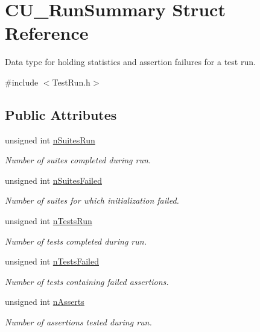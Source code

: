 \hypertarget{struct_c_u___run_summary}{\section{C\+U\+\_\+\+Run\+Summary Struct Reference}
\label{struct_c_u___run_summary}
}


Data type for holding statistics and assertion failures for a test run.  




{\ttfamily \#include $<$Test\+Run.\+h$>$}

\subsection*{Public Attributes}
\begin{DoxyCompactItemize}
\item 
unsigned int \hyperlink{struct_c_u___run_summary_ae426617945d15652562f4d2b5d243f51}{n\+Suites\+Run}
\begin{DoxyCompactList}\small\item\em Number of suites completed during run. \end{DoxyCompactList}\item 
unsigned int \hyperlink{struct_c_u___run_summary_a7ef012ea5105cd86ff16bf131f1d0ac2}{n\+Suites\+Failed}
\begin{DoxyCompactList}\small\item\em Number of suites for which initialization failed. \end{DoxyCompactList}\item 
unsigned int \hyperlink{struct_c_u___run_summary_a15da425a520dfb2628febc5313c92aa7}{n\+Tests\+Run}
\begin{DoxyCompactList}\small\item\em Number of tests completed during run. \end{DoxyCompactList}\item 
unsigned int \hyperlink{struct_c_u___run_summary_a3a3be4dfb55ceffdb2ffacdac9796d24}{n\+Tests\+Failed}
\begin{DoxyCompactList}\small\item\em Number of tests containing failed assertions. \end{DoxyCompactList}\item 
unsigned int \hyperlink{struct_c_u___run_summary_a90899c9309e2b4374443a7d5ab226a90}{n\+Asserts}
\begin{DoxyCompactList}\small\item\em Number of assertions tested during run. \end{DoxyCompactList}\item 

\end{DoxyCompactItemize}

